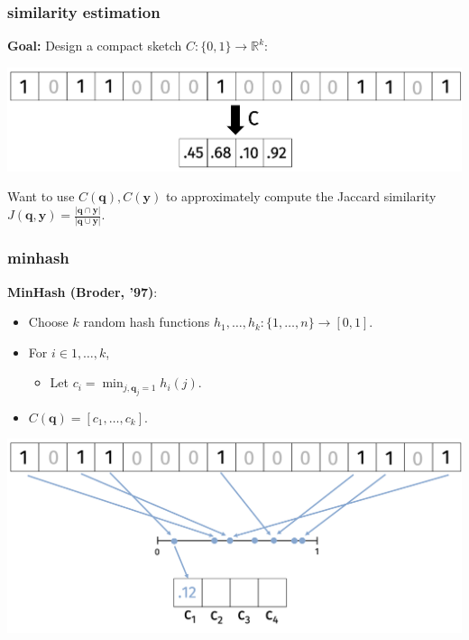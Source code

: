 \documentclass[compress]{beamer}
\newcommand{\bv}[1]{\mathbf{#1}}
\newcommand{\R}{\mathbb{R}}
\begin{document}
\begin{frame}
	\frametitle{similarity estimation}
	\textbf{Goal:} Design a compact sketch $C: \{0,1\}\rightarrow \R^k$:
	\begin{center}
			\vspace{-.5em}
			\includegraphics[width=.8\textwidth]{compression.png}
			\vspace{-.5em}
		\end{center}
	Want to use $C(\bv{q}), C(\bv{y})$ to approximately compute the Jaccard similarity $J(\bv{q},\bv{y}) = \frac{|\bv{q} \cap \bv{y}|}{|\bv{q} \cup \bv{y}|}$.
\end{frame}

\begin{frame}
	\frametitle{minhash}
	\textbf{MinHash (Broder, '97)}:
	\begin{itemize}
		\item Choose $k$ random hash functions $h_1, \ldots, h_k: \{1,\ldots, n\} \rightarrow [0,1]$. 
		\item For $i\in 1, \ldots,k$, 
		\begin{itemize}
			\item Let $c_i = \min_{j, \bv{q}_j = 1} h_i(j)$.
		\end{itemize}
		\item $C(\bv{q}) = [c_1, \ldots, c_k]$.
	\end{itemize}
	\begin{center}
		\includegraphics[width=\textwidth]{minHash1.png}	
	\end{center}
\end{frame}
\end{document}

